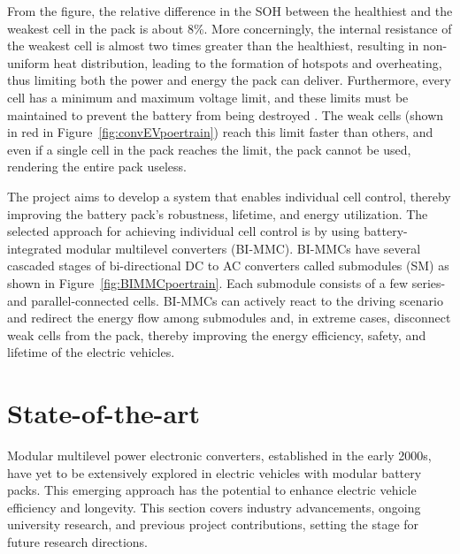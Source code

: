 \documentclass{article}
\begin{document}
From the figure, the relative difference in the SOH between the healthiest and the weakest cell in the pack is about 8\%. More concerningly, the internal resistance of the weakest cell is almost two times greater than the healthiest, resulting in non-uniform heat distribution, leading to the formation of hotspots and overheating, thus limiting both the power and energy the pack can deliver. Furthermore, every cell has a minimum and maximum voltage limit, and these limits must be maintained to prevent the battery from being destroyed \cite{garche2018electrochemical}. The weak cells (shown in red in Figure~\ref{fig:convEVpoertrain}) reach this limit faster than others, and even if a single cell in the pack reaches the limit, the pack cannot be used, rendering the entire pack useless.

The project aims to develop a system that enables individual cell control, thereby improving the battery pack's robustness, lifetime, and energy utilization. The selected approach for achieving individual cell control is by using battery-integrated modular multilevel converters (BI-MMC). BI-MMCs have several cascaded stages of bi-directional DC to AC converters called submodules (SM) as shown in Figure~\ref{fig:BIMMCpoertrain}. Each submodule consists of a few series- and parallel-connected cells. BI-MMCs can actively react to the driving scenario and redirect the energy flow among submodules and, in extreme cases, disconnect weak cells from the pack, thereby improving the energy efficiency, safety, and lifetime of the electric vehicles.

\section{State-of-the-art}
Modular multilevel power electronic converters, established in the early 2000s, have yet to be extensively explored in electric vehicles with modular battery packs. This emerging approach has the potential to enhance electric vehicle efficiency and longevity. This section covers industry advancements, ongoing university research, and previous project contributions, setting the stage for future research directions.
\end{document}
